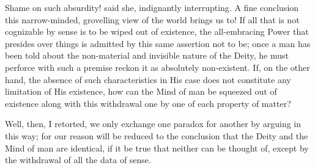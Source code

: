 Shame on such absurdity! said she, indignantly interrupting. A fine conclusion this narrow-minded, grovelling view of the world brings us to! If all that is not cognizable by sense is to be wiped out of existence, the all-embracing Power that presides over things is admitted by this same assertion not to be; once a man has been told about the non-material and invisible nature of the Deity, he must perforce with such a premise reckon it as absolutely non-existent. If, on the other hand, the absence of such characteristics in His case does not constitute any limitation of His existence, how can the Mind of man be squeezed out of existence along with this withdrawal one by one of each property of matter?

Well, then, I retorted, we only exchange one paradox for another by arguing in this way; for our reason will be reduced to the conclusion that the Deity and the Mind of man are identical, if it be true that neither can be thought of, except by the withdrawal of all the data of sense.

